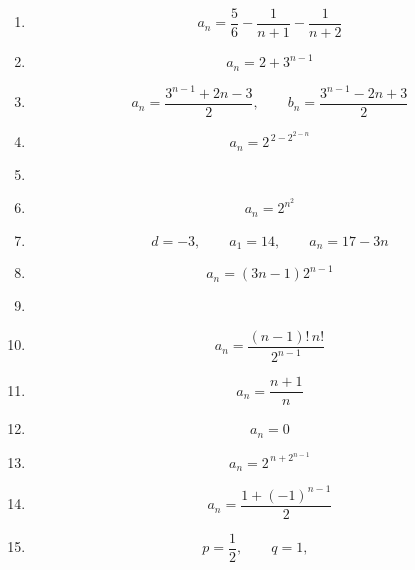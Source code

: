 \begin{enumerate}[label=\textbf{問\arabic*.},leftmargin=3.8em,format=\bookitemlink{practice-basic}{answer}{problem}]
\[                  r=-2,\qquad a_n=3(-2)^{n-1}
                \]
          \item \[
                  a_n=\frac56-\frac1{n+1}-\frac1{n+2}
                \]
          \item \[
                  a_n=2+3^{n-1}
                \]
          \item \[
                  a_n=\frac{3^{n-1}+2n-3}{2},\qquad b_n=\frac{3^{n-1}-2n+3}{2}
                \]
          \item \[
                  a_n=2^{\,2-2^{2-n}}
                \]
\item \BookMathLayout{\[
                  a_n=3+(t-3)4^{n-1},\qquad
                \text{定数数列となるのは }t=3
                \]}{
\[
\begin{aligned}
a_n&=3+(t-3)4^{n-1},\\
&\text{定数数列となるのは }t=3
\end{aligned}
\]
}
          \item \[
                  a_n=2^{n^2}
                \]
          \item \[
                  d=-3,\qquad a_1=14,\qquad a_n=17-3n
                \]
          \item \[
                  a_n=(3n-1)2^{n-1}
                \]
\item \BookMathLayout{\[
                  a_n=\frac{2^n+(-1)^{n-1}}{3},\qquad b_n=\frac{2^{n-1}-(-1)^{n-1}}{3}
                \]}{
\[
\begin{aligned}
a_n&=\frac{2^n+(-1)^{n-1}}3,\\
b_n&=\frac{2^{n-1}-(-1)^{n-1}}3
\end{aligned}
\]
}
          \item \[
                  a_n=\frac{(n-1)!\,n!}{2^{n-1}}
                \]
          \item \[
                  a_n=\frac{n+1}{n}
                \]
          \item \[
                  a_n=0
                \]
          \item \[
                  a_n=2^{\,n+2^{n-1}}
                \]
          \item \[
                  a_n=\frac{1+(-1)^{n-1}}2
                \]
          \item \[
                  p=\frac12,\qquad q=1,\qquad
\]
\end{enumerate}
